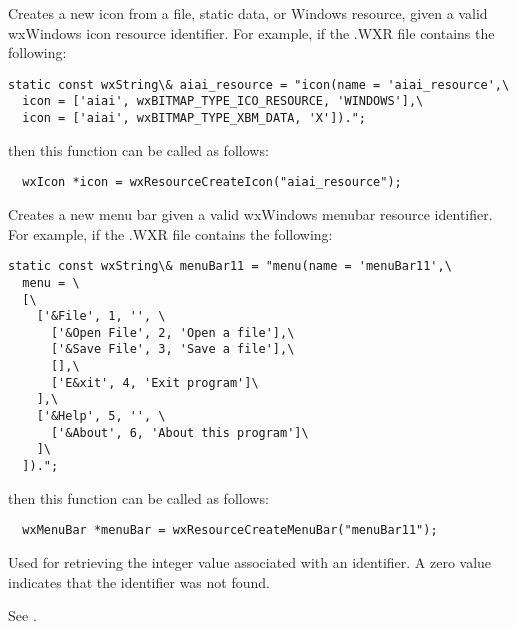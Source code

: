 

Creates a new icon from a file, static data, or Windows resource, given a valid
wxWindows icon resource identifier. For example, if the .WXR file contains
the following:

\begin{verbatim}
static const wxString\& aiai_resource = "icon(name = 'aiai_resource',\
  icon = ['aiai', wxBITMAP_TYPE_ICO_RESOURCE, 'WINDOWS'],\
  icon = ['aiai', wxBITMAP_TYPE_XBM_DATA, 'X']).";
\end{verbatim}

then this function can be called as follows:

\begin{verbatim}
  wxIcon *icon = wxResourceCreateIcon("aiai_resource");
\end{verbatim}



Creates a new menu bar given a valid wxWindows menubar resource
identifier. For example, if the .WXR file contains the following:

\begin{verbatim}
static const wxString\& menuBar11 = "menu(name = 'menuBar11',\
  menu = \
  [\
    ['&File', 1, '', \
      ['&Open File', 2, 'Open a file'],\
      ['&Save File', 3, 'Save a file'],\
      [],\
      ['E&xit', 4, 'Exit program']\
    ],\
    ['&Help', 5, '', \
      ['&About', 6, 'About this program']\
    ]\
  ]).";
\end{verbatim}

then this function can be called as follows:

\begin{verbatim}
  wxMenuBar *menuBar = wxResourceCreateMenuBar("menuBar11");
\end{verbatim}




Used for retrieving the integer value associated with an identifier.
A zero value indicates that the identifier was not found.

See .

